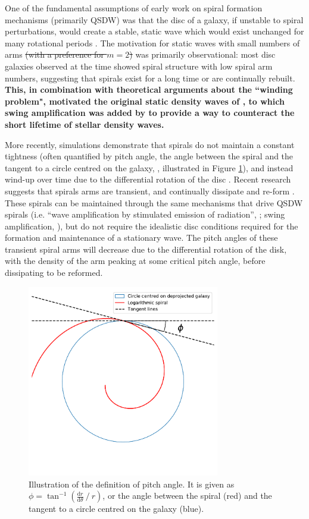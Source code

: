 One of the fundamental assumptions of early work on spiral formation mechanisms (primarily QSDW) was that the disc of a galaxy, if unstable to spiral perturbations, would create a stable, static wave which would exist unchanged for many rotational periods \citep{1964ApJ...140..646L}. The motivation for static waves with small numbers of arms \sout{(with a preference for $m=2$)} was primarily observational: most disc galaxies observed at the time showed spiral structure with low spiral arm numbers, suggesting that spirals exist for a long time or are continually rebuilt. \textbf{This, in combination with theoretical arguments about the ``winding problem", motivated the original static density waves of \citet{1964ApJ...140..646L}, to which swing amplification was added by \citet{Toomre1981}  to provide a way to counteract the short lifetime of stellar density waves.}

More recently, simulations demonstrate that spirals do not maintain a constant tightness (often quantified by pitch angle, the angle between the spiral and the tangent to a circle centred on the galaxy, \citealt{1987gady.book.....B}, illustrated in Figure \ref{fig:pitch-angle-example}), and instead wind-up over time due to the differential rotation of the disc \citep{2013ApJ...763...46B}. Recent research suggests that spirals arms are transient, and continually dissipate and re-form \citep{2014PASA...31...35D}. These spirals can be maintained through the same mechanisms that drive QSDW spirals (i.e. ``wave amplification by stimulated emission of radiation'', \citealt{1976ApJ...205..363M}; swing amplification, \citealt{1965MNRAS.130..125G}), but do not require the idealistic disc conditions required for the formation and maintenance of a stationary wave. The pitch angles of these transient spiral arms will decrease due to the differential rotation of the disk, with the density of the arm peaking at some critical pitch angle, before dissipating to be reformed.

\begin{figure}
  \includegraphics[width=8.4cm]{plots/pitch-angle-explanation.pdf}
  \caption{Illustration of the definition of pitch angle. It is given as $\phi = \tan^{-1}\left(\frac{\mathrm{d}r}{\mathrm{d}\theta}\ /\ r\right)$, or the angle between the spiral (red) and the tangent to a circle centred on the galaxy (blue).}
  \label{fig:pitch-angle-example}
\end{figure}

